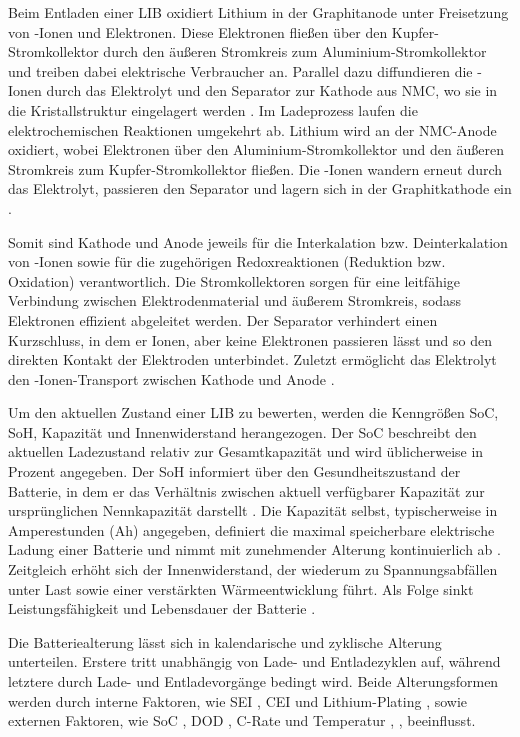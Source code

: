 Beim Entladen einer \acs{LIB} oxidiert Lithium in der Graphitanode unter Freisetzung von -Ionen und Elektronen. Diese Elektronen fließen über den Kupfer-Stromkollektor durch den äußeren Stromkreis zum Aluminium-Stromkollektor und treiben dabei elektrische Verbraucher an. Parallel dazu diffundieren die -Ionen durch das Elektrolyt und den Separator zur Kathode aus \ac{NMC}, wo sie in die Kristallstruktur eingelagert werden \cite{urlIdLIBFUnktionsweise}. Im Ladeprozess laufen die elektrochemischen Reaktionen umgekehrt ab. Lithium wird an der NMC-Anode oxidiert, wobei Elektronen über den Aluminium-Stromkollektor und den äußeren Stromkreis zum Kupfer-Stromkollektor fließen. Die -Ionen wandern erneut durch das Elektrolyt, passieren den Separator und lagern sich in der Graphitkathode ein \cite{urlIdLIBFUnktionsweise}.
\par
Somit sind Kathode und Anode jeweils für die Interkalation bzw. Deinterkalation von -Ionen sowie für die zugehörigen Redoxreaktionen (Reduktion bzw. Oxidation) verantwortlich. Die Stromkollektoren sorgen für eine leitfähige Verbindung zwischen Elektrodenmaterial und äußerem Stromkreis, sodass Elektronen effizient abgeleitet werden. Der Separator verhindert einen Kurzschluss, in dem er Ionen, aber keine Elektronen passieren lässt und so den direkten Kontakt der Elektroden unterbindet. Zuletzt ermöglicht das Elektrolyt den -Ionen-Transport zwischen Kathode und Anode \cite{urlIdDifferentAgingMethodsForLIBs}.
\par
Um den aktuellen Zustand einer \acs{LIB} zu bewerten, werden die Kenngrößen \ac{SoC}, \ac{SoH}, Kapazität und Innenwiderstand herangezogen. Der \acs{SoC} beschreibt den aktuellen Ladezustand relativ zur Gesamtkapazität und wird üblicherweise in Prozent angegeben. Der \acs{SoH} informiert über den Gesundheitszustand der Batterie, in dem er das Verhältnis zwischen aktuell verfügbarer Kapazität zur ursprünglichen Nennkapazität darstellt \cite{urlIdSoCSoHDependencyLIBs}. Die Kapazität selbst, typischerweise in Amperestunden (Ah) angegeben, definiert die maximal speicherbare elektrische Ladung einer Batterie und nimmt mit zunehmender Alterung kontinuierlich ab \cite{articleAlterungLithiumBatterien}. Zeitgleich erhöht sich der Innenwiderstand, der wiederum zu Spannungsabfällen unter Last sowie einer verstärkten Wärmeentwicklung führt. Als Folge sinkt Leistungsfähigkeit und Lebensdauer der Batterie \cite{urlIdBatterieALterungInternerWiderstand}.
\par
Die Batteriealterung lässt sich in kalendarische und zyklische Alterung unterteilen. Erstere tritt unabhängig von Lade- und Entladezyklen auf, während letztere durch Lade- und Entladevorgänge bedingt wird. Beide Alterungsformen werden durch interne Faktoren, wie \ac{SEI} \cite{urlIdBatterieAlterungSEI}, \ac{CEI} \cite{urlIdBatterieAlterungCEI} und Lithium-Plating \cite{urlIdBatterieAlterungLithiumPlating}, sowie externen Faktoren, wie \acs{SoC} \cite{urlIdBatterieAlterungVerschiedenerSoCLithiumBatterien}, \ac{DOD} \cite{urlIdAlterungDOD}, C-Rate \cite{urlIdBatterieNiedrigeTemperaturenLithiumBatterien} und Temperatur \cite{urlIdBatterieAlterungTemperatur}, \cite{urlIdBatterieAlterungTemperatur2}, beeinflusst.
